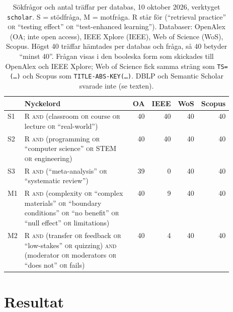 \begin{table}[htbp]
  \centering
  \caption{Sökfrågor och antal träffar per databas, 10 oktober 2026,
    verktyget \texttt{scholar}.  S = stödfråga, M = motfråga.  R står
    för (\enquote{retrieval practice} \textsc{or} \enquote{testing
    effect} \textsc{or} \enquote{test-enhanced learning}).  Databaser:
    OpenAlex (OA; inte \foreignlanguage{english}{open access}), IEEE
    Xplore (IEEE), Web of Science (WoS), Scopus.  Högst 40 träffar
    hämtades per databas och fråga, så 40 betyder \enquote{minst 40}.
    Frågan visas i den booleska form som skickades till OpenAlex och IEEE
    Xplore; Web of Science fick samma sträng som \texttt{TS=(\dots)} och
    Scopus som \texttt{TITLE-ABS-KEY(\dots)}.  DBLP och Semantic Scholar
    svarade inte (se texten).}
  \label{tab:recap-retrieval-queries}
  \footnotesize
  \begin{tabular}{@{}lp{0.52\linewidth}rrrr@{}}
    \toprule
    & Nyckelord & OA & IEEE & WoS & Scopus \\
    \midrule
    S1 & R \textsc{and} (classroom \textsc{or} course \textsc{or} lecture
      \textsc{or} \enquote{real-world})
      & 40 & 40 & 40 & 40 \\
    S2 & R \textsc{and} (programming \textsc{or} \enquote{computer
      science} \textsc{or} STEM \textsc{or} engineering)
      & 40 & 40 & 40 & 40 \\
    S3 & R \textsc{and} (\enquote{meta-analysis} \textsc{or}
      \enquote{systematic review})
      & 39 & 0 & 40 & 40 \\
    M1 & R \textsc{and} (complexity \textsc{or} \enquote{complex
      materials} \textsc{or} \enquote{boundary conditions} \textsc{or}
      \enquote{no benefit} \textsc{or} \enquote{null effect} \textsc{or}
      limitations)
      & 40 & 9 & 40 & 40 \\
    M2 & R \textsc{and} (transfer \textsc{or} feedback \textsc{or}
      \enquote{low-stakes} \textsc{or} quizzing) \textsc{and} (moderator
      \textsc{or} moderators \textsc{or} \enquote{does not} \textsc{or}
      fails)
      & 40 & 4 & 40 & 40 \\
    \bottomrule
  \end{tabular}
\end{table}

\section{Resultat}
\label{sec:recap-retrieval-resultat}

